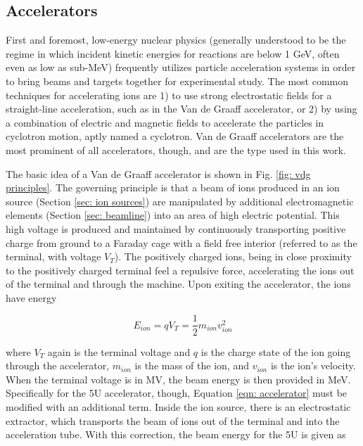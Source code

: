 \subsection{Accelerators}
\label{sec: accelerators}

First and foremost, low-energy nuclear physics (generally understood to be the regime in which incident kinetic energies for reactions are below 1 GeV, often even as low as sub-MeV) frequently utilizes particle acceleration systems in order to bring beams and targets together for experimental study. The most common techniques for accelerating ions are 1) to use strong electrostatic fields for a straight-line acceleration, such as in the Van de Graaff accelerator, or 2)  by using a combination of electric and magnetic fields to accelerate the particles in cyclotron motion, aptly named a cyclotron. Van de Graaff accelerators are the most prominent of all accelerators, though, and are the type used in this work. 

The basic idea of a Van de Graaff accelerator is shown in Fig. \ref{fig: vdg principles}. The governing principle is that a beam of ions produced in an ion source (Section \ref{sec: ion sources}) are manipulated by additional electromagnetic elements (Section \ref{sec: beamline}) into an area of high electric potential. This high voltage is produced and maintained by continuously transporting positive charge from ground to a Faraday cage with a field free interior (referred to as the terminal, with voltage $V_{T}$). The positively charged ions, being in close proximity to the positively charged terminal feel a repulsive force, accelerating the ions out of the terminal and through the machine. Upon exiting the accelerator, the ions have energy

\begin{equation}
E_{ion} = qV_{T} = \dfrac{1}{2} m_{ion} v_{ion}^{2}
\label{eqn: accelerator}
\end{equation}

\noindent where $V_{T}$ again is the terminal voltage and $q$ is the charge state of the ion going through the accelerator, $m_{ion}$ is the mass of the ion, and $v_{ion}$ is the ion's velocity. When the terminal voltage is in MV, the beam energy is then provided in MeV. Specifically for the 5U accelerator, though, Equation \ref{eqn: accelerator} must be modified with an additional term. Inside the ion source, there is an electrostatic extractor, which transports the beam of ions out of the terminal and into the acceleration tube. With this correction, the beam energy for the 5U is given as

